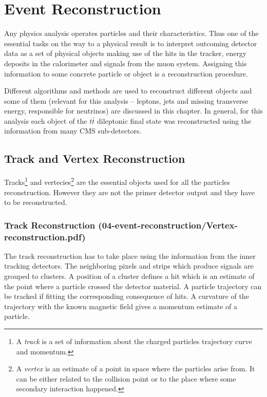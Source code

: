 \chapter{Event Reconstruction}\label{chapt:event_selection}

Any physics analysis operates particles and their characteristics. Thus one of the essential tasks on the way to a physical
result is to interpret outcoming detector data as a set of physical objects making use of the hits
in the tracker, energy deposits in the calorimeter and signals from the muon system. Assigning this information to some concrete particle 
or object is a reconstruction procedure.

Different algorithms and methods are used to reconstruct different objects and some of them (relevant for this analysis -- leptons, jets and missing transverse
energy, responsible for neutrinos) are discussed in this
chapter. In general, for this analysis each object of the $t\bar{t}$ dileptonic final state was reconstructed using the information from many
CMS sub-detectors.

\section{Track and Vertex Reconstruction}
 
Tracks\footnote{A \textit{track} is a set of information about the charged particles trajectory curve and momentum.} and vertecies\footnote{A 
\textit{vertex} is an estimate of a point in space where the particles arise from. It can be either related to the 
collision point or to the place  where some secondary interaction happened.} are the essential objects used for all the particles reconstruction. 
However they are not the primer detector output and they have to be reconstructed.

\subsection{Track Reconstruction (04-event-reconstruction/Vertex-reconstruction.pdf)}

The track reconstruction has to take place using the information from the inner tracking detectors. The neighboring pixels and strips which
produce signals are grouped to clusters. A position of a cluster defines a hit which is an estimate of the point where a particle crossed the
detector material. A particle trajectory can be tracked if fitting the corresponding consequence of hits. A curvature 
of the trajectory with the known magnetic field gives a momentum estimate of a particle.

